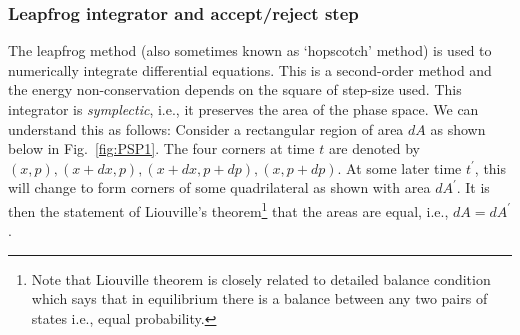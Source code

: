 \documentclass[letter,11pt]{article}
\begin{document}
\subsubsection{Leapfrog integrator and accept/reject step}
The leapfrog method (also sometimes known as `hopscotch' method) 
is used to numerically integrate differential equations. This is a second-order 
method and the energy non-conservation depends on the square of step-size used. This integrator is \emph{symplectic}, i.e., it preserves the 
area of the phase space. We can understand this as follows: 
Consider a rectangular region of area $dA$ as shown below in Fig.~\ref{fig:PSP1}. The four corners at time $t$ are denoted by $(x, p), (x+dx, p), (x+dx, p+dp),(x, p+dp)$. At some later time $t^{\prime}$, this will change to form corners of some quadrilateral as shown with area $dA^{\prime}$. It is then the statement of Liouville's theorem\footnote{Note that Liouville theorem is closely related to detailed balance condition which says that in equilibrium there is a balance between any two pairs of states i.e., equal probability.} that the areas are equal, i.e., $dA = dA^{\prime}$. 
\end{document}
